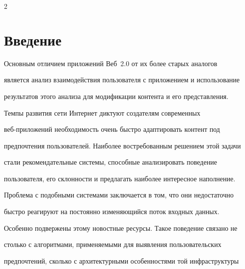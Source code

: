 









      \thispagestyle{headings}





      \begin{multicols}{2}





            \label{st\stat}








\section{Введение}





   Основным отличием приложений Веб~2.0 от их более старых аналогов 


является анализ взаимодействия пользователя с приложением и использование 


результатов этого анализа для модификации контента и его представления. 


Темпы развития сети Интернет диктуют создателям современных 


   веб-при\-ло\-же\-ний необходимость очень быстро адап\-ти\-ро\-вать контент под 


предпочтения пользователей. Наиболее востребованным решением этой задачи 


стали рекомендательные сис\-те\-мы, способные анализировать поведение 


пользователя, его склон\-ности и предлагать наиболее интересное наполнение. 


Проблема с подобными системами заключается в том, что они недостаточно 


быстро реагируют на постоянно изменяющийся поток входных данных. 


Особенно подвержены этому новостные ресурсы. Такое поведение связано не 


столько с алгоритмами, применяемыми для выявления пользовательских 


предпочтений, сколько с архитектурными особенностями той инфраструктуры 



\end{multicols}
